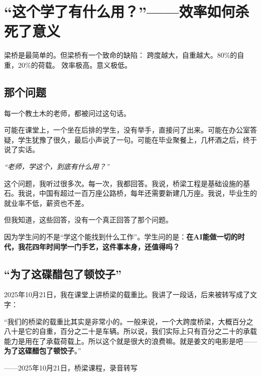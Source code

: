 
\chapter{``这个学了有什么用？''——效率如何杀死了意义}

\vspace{0.5cm}

\begin{center}
{\small\color{muted} 梁桥是最简单的。但梁桥有一个致命的缺陷：}
{\small\color{muted} 跨度越大，自重越大。80\%的自重，20\%的荷载。}
{\small\color{muted} 效率极高。意义极低。}
\end{center}

\vspace{1cm}

\section{那个问题}

每一个教土木的老师，都被问过这句话。

可能在课堂上，一个坐在后排的学生，没有举手，直接问了出来。可能在办公室答疑，学生犹豫了很久，最后小声说了一句。可能在毕业聚餐上，几杯酒之后，终于说了实话。

\begin{center}
{\large\itshape ``老师，学这个，到底有什么用？''}
\end{center}

这个问题，我听过很多次。每一次，我都回答。我说，桥梁工程是基础设施的基石。我说，中国有超过一百万座公路桥，每年还需要新建几万座。我说，毕业生的就业率不低，薪资也不差。

但我知道，这些回答，没有一个真正回答了那个问题。

因为学生问的不是``学这个能找到什么工作''。学生问的是：\textbf{在AI能做一切的时代，我花四年时间学一门手艺，这件事本身，还值得吗？}

\section{``为了这碟醋包了顿饺子''}

2025年10月21日，我在课堂上讲桥梁的载重比。我讲了一段话，后来被转写成了文字：

\begin{shiyu-inline}
``我们的桥梁的载重比其实是非常小的。一般来说，一个大跨度桥梁，大概百分之八十是它的自重，百分之二十是车辆。所以说，我们实际上只有百分之二十的承载能力是用在了承载荷载上。所以这个就是很大的浪费嘛。就是姜文的电影是吧——\textbf{为了这碟醋包了顿饺子}。''

\hfill ——2025年10月21日，桥梁课程，录音转写
\end{shiyu-inline}

